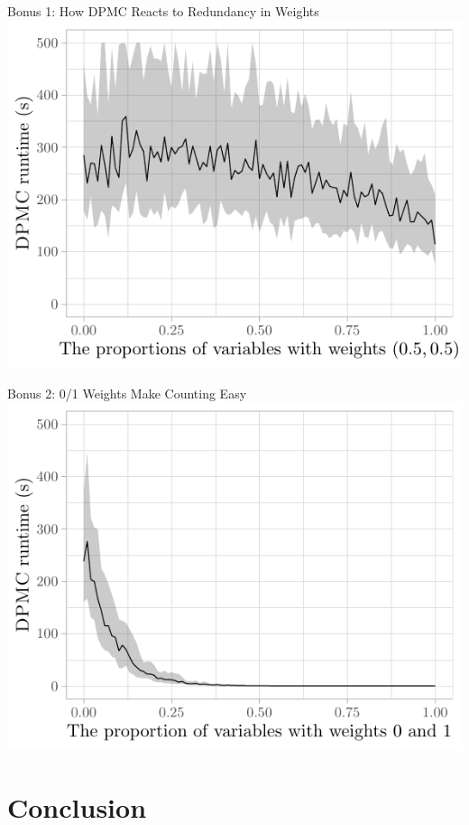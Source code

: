 \documentclass{beamer}
\begin{document}
\begin{frame}{Bonus 1: How \textsc{DPMC} Reacts to Redundancy in Weights}
  \centering
  \includegraphics{epsilon}
\end{frame}

\begin{frame}{Bonus 2: 0/1 Weights Make Counting Easy}
  \centering
  \includegraphics{delta}
\end{frame}

\section{Conclusion}
\end{document}
